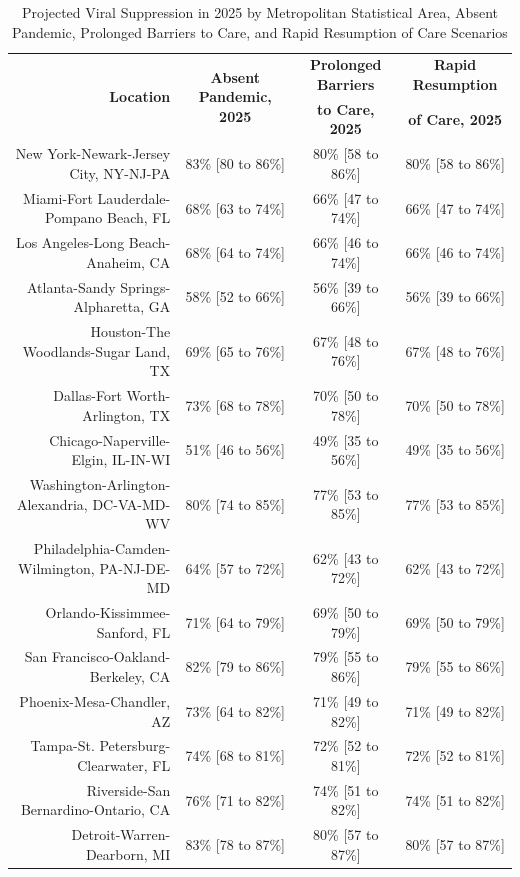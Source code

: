 \documentclass{article}
\begin{document}
\begin{table}[H]
	\caption{Projected Viral Suppression in 2025 by Metropolitan Statistical Area, Absent Pandemic, Prolonged Barriers to Care, and Rapid Resumption of Care Scenarios}
	\footnotesize
	\begin{tabular}{|r|c|c|c|}
		\hline
		\multirow{2}{*}{\textbf{Location}} & \multirow{2}{*}{\textbf{Absent Pandemic, 2025}} & \textbf{Prolonged Barriers} & \textbf{Rapid Resumption}\\
		&  & \textbf{to Care, 2025} & \textbf{of Care, 2025}\\
		\hline\hline
		New York-Newark-Jersey City, NY-NJ-PA & 83\% [80 to 86\%] & 80\% [58 to 86\%] & 80\% [58 to 86\%]\\
		Miami-Fort Lauderdale-Pompano Beach, FL & 68\% [63 to 74\%] & 66\% [47 to 74\%] & 66\% [47 to 74\%]\\
		Los Angeles-Long Beach-Anaheim, CA & 68\% [64 to 74\%] & 66\% [46 to 74\%] & 66\% [46 to 74\%]\\
		Atlanta-Sandy Springs-Alpharetta, GA & 58\% [52 to 66\%] & 56\% [39 to 66\%] & 56\% [39 to 66\%]\\
		Houston-The Woodlands-Sugar Land, TX & 69\% [65 to 76\%] & 67\% [48 to 76\%] & 67\% [48 to 76\%]\\
		Dallas-Fort Worth-Arlington, TX & 73\% [68 to 78\%] & 70\% [50 to 78\%] & 70\% [50 to 78\%]\\
		Chicago-Naperville-Elgin, IL-IN-WI & 51\% [46 to 56\%] & 49\% [35 to 56\%] & 49\% [35 to 56\%]\\
		Washington-Arlington-Alexandria, DC-VA-MD-WV & 80\% [74 to 85\%] & 77\% [53 to 85\%] & 77\% [53 to 85\%]\\
		Philadelphia-Camden-Wilmington, PA-NJ-DE-MD & 64\% [57 to 72\%] & 62\% [43 to 72\%] & 62\% [43 to 72\%]\\
		Orlando-Kissimmee-Sanford, FL & 71\% [64 to 79\%] & 69\% [50 to 79\%] & 69\% [50 to 79\%]\\
		San Francisco-Oakland-Berkeley, CA & 82\% [79 to 86\%] & 79\% [55 to 86\%] & 79\% [55 to 86\%]\\
		Phoenix-Mesa-Chandler, AZ & 73\% [64 to 82\%] & 71\% [49 to 82\%] & 71\% [49 to 82\%]\\
		Tampa-St. Petersburg-Clearwater, FL & 74\% [68 to 81\%] & 72\% [52 to 81\%] & 72\% [52 to 81\%]\\
		Riverside-San Bernardino-Ontario, CA & 76\% [71 to 82\%] & 74\% [51 to 82\%] & 74\% [51 to 82\%]\\
		Detroit-Warren-Dearborn, MI & 83\% [78 to 87\%] & 80\% [57 to 87\%] & 80\% [57 to 87\%]\\

\end{tabular}
\end{table}
\end{document}

